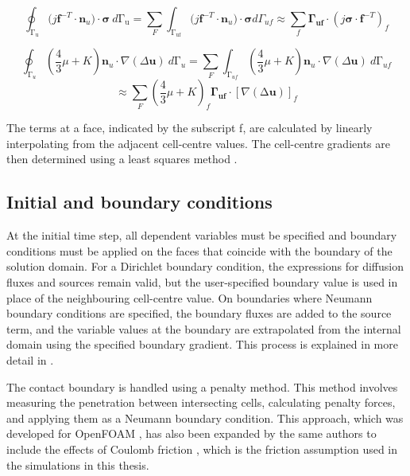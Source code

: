 \documentclass[sn-mathphys,Numbered,draft]{sn-jnl}%
\begin{document}
\begin{itemize}
	\begin{equation}
\oint_{\mathrm{\Gamma_u}}(j\mathbf{f}^{-T}\cdot{\mathbf{n}_u)\cdot\boldsymbol{\sigma}}\ d\mathrm{\Gamma_u}=\sum_{F}\int_{\mathrm{\Gamma_{uf}}}(j\mathbf{f}^{-T}\cdot{\mathbf{n}_u)\cdot\boldsymbol{\sigma}}d\Gamma_{uf}\approx\sum_{f}\mathbf{\Gamma_{uf}}\cdot\left(j\boldsymbol{\sigma}\cdot\mathbf{f}^{-T}\right)_f
	\end{equation}
	
	\begin{equation}
	    \oint_{\mathrm{\Gamma}_u}{\left(\frac{4}{3}\mu+K\right)\mathbf{n}_u\cdot\nabla\left(\Delta\mathbf{u}\right)}\ d\mathrm{\Gamma}_u= 
	    \sum_{F}\int_{\mathrm{\Gamma}_{uf}}{\left(\frac{4}{3}\mu+K\right)\mathbf{n}_u\cdot\nabla\left(\Delta\mathbf{u}\right)}\ d\mathrm{\Gamma}_{uf}
	\end{equation}
	\begin{equation}	
	\approx\sum_{F}\left(\frac{4}{3}\mu+K\right)_f\mathbf{\Gamma_{uf}}\cdot\left[\nabla\left(\mathrm{\Delta}\mathbf{u}\right)\right]_f
	\end{equation}

The terms at a face, indicated by the subscript f, are calculated by linearly interpolating from the adjacent cell-centre values. The cell-centre gradients are then determined using a least squares method \cite{noauthor_openfoam_2015}. 

\end{itemize}


\subsection{Initial and boundary conditions}

At the initial time step, all dependent variables must be specified and boundary conditions must be applied on the faces that coincide with the boundary of the solution domain. For a Dirichlet boundary condition, the expressions for diffusion fluxes and sources remain valid, but the user-specified boundary value is used in place of the neighbouring cell-centre value. On boundaries where Neumann boundary conditions are specified, the boundary fluxes are added to the source term, and the variable values at the boundary are extrapolated from the internal domain using the specified boundary gradient. This process is explained in more detail in \cite{jasak_application_2000}.

The contact boundary is handled using a penalty method. This method involves measuring the penetration between intersecting cells, calculating penalty forces, and applying them as a Neumann boundary condition. This approach, which was developed for OpenFOAM \cite{cardiff_development_2012}, has also been expanded by the same authors to include the effects of Coulomb friction \cite{cardiff_lagrangian_2017}, which is the friction assumption used in the simulations in this thesis.
\end{document}
